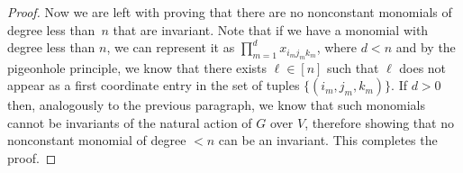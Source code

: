 \begin{proof}
	Now we are left with proving that there are no nonconstant monomials of degree less than~$n$ that are invariant.
  Note that if we have a monomial with degree less than $n$, we can represent it as
	$\prod_{m=1}^d x_{i_m j_m k_m}$, where $d < n$ and by the pigeonhole principle, we know that
	there exists $\ell \in [n]$ such that $\ell$ does not appear as a first coordinate entry in
	the set of tuples $\{(i_m, j_m, k_m)\}$. If $d>0$ then, analogously to the previous paragraph, we know
	that such monomials cannot be invariants of the natural action of $G$ over $V$, therefore showing
	that no nonconstant monomial of degree $< n$ can be an invariant. This completes the proof.
\end{proof}





